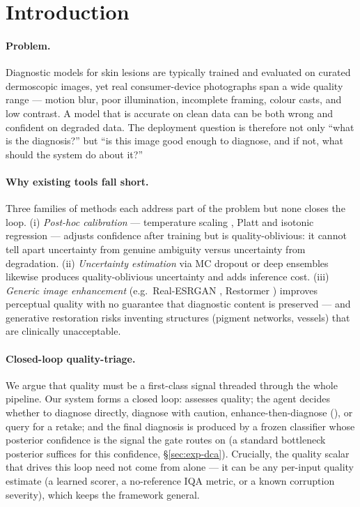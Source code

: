 \documentclass{article}
\begin{document}
\section{Introduction}\label{sec:intro}

\paragraph{Problem.}
Diagnostic models for skin lesions are typically trained and evaluated on curated dermoscopic
images, yet real consumer-device photographs span a wide quality range --- motion blur, poor
illumination, incomplete framing, colour casts, and low contrast. A model that is accurate on clean
data can be both wrong and confident on degraded data. The deployment question is therefore not only
``what is the diagnosis?'' but ``is this image good enough to diagnose, and if not, what should the
system do about it?''

\paragraph{Why existing tools fall short.}
Three families of methods each address part of the problem but none closes the loop.
(i) \emph{Post-hoc calibration} --- temperature scaling \citep{guo2017calibration}, Platt and isotonic
regression --- adjusts confidence after training but is quality-oblivious: it cannot tell apart
uncertainty from genuine ambiguity versus uncertainty from degradation.
(ii) \emph{Uncertainty estimation} via MC dropout \citep{gal2016dropout} or deep ensembles
\citep{lakshminarayanan2017simple} likewise produces quality-oblivious uncertainty and adds
inference cost.
(iii) \emph{Generic image enhancement} (e.g.\ Real-ESRGAN \citep{wang2021realesrgan}, Restormer
\citep{zamir2022restormer}) improves perceptual quality
with no guarantee that diagnostic content is preserved --- and generative restoration risks
inventing structures (pigment networks, vessels) that are clinically unacceptable.

\paragraph{Closed-loop quality-triage.}
We argue that quality must be a first-class signal threaded through the whole pipeline. Our system
forms a closed loop: \visiscore assesses quality; the agent decides whether to diagnose directly,
diagnose with caution, enhance-then-diagnose (\visienhance), or query for a retake; and the final
diagnosis is produced by a frozen classifier whose posterior confidence is the signal the gate routes
on (a standard bottleneck posterior suffices for this confidence, \S\ref{sec:exp-dca}). Crucially,
the quality scalar that drives this loop need not come from \visiscore alone --- it can be any
per-input quality estimate (a learned scorer, a no-reference IQA metric, or a known corruption
severity), which keeps the framework general.
\end{document}

